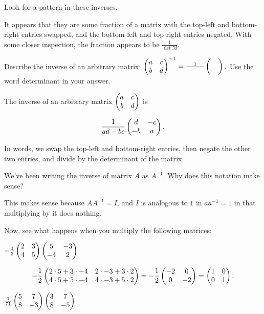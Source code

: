 \documentclass[../gatm_answers.tex]{subfiles}
\begin{document}
\begin{inner_problem}[start=1]
\item Look for a pattern in these inverses.
\end{inner_problem}

It appears that they are some fraction of a matrix with the top-left and bottom-right entries swapped, and the bottom-left and top-right entries negated. With some closer inspection, the fraction appears to be $\frac{1}{\det M}$.

\begin{inner_problem}
\item Describe the inverse of an arbitrary matrix: $\begin{pmatrix} a & c \\ b & d \end{pmatrix}^{-1}=\frac{1}{\phantom{000000}}\begin{pmatrix}  &  \\  &  \end{pmatrix}.$ Use the word determinant in your answer.
\end{inner_problem}

The inverse of an arbitrary matrix $\begin{pmatrix} a & c \\ b & d \end{pmatrix}$ is

$$\frac{1}{ad-bc}\begin{pmatrix} d & -c \\ -b & a \end{pmatrix}.$$

In words, we swap the top-left and bottom-right entries, then negate the other two entries, and divide by the determinant of the matrix.

\begin{inner_problem}
\item We've been writing the inverse of matrix $A$ as $A^{-1}$. Why does this notation make sense?
\end{inner_problem}

This makes sense because $AA^{-1}=I$, and $I$ is analogous to $1$ in $aa^{-1}=1$ in that multiplying by it does nothing.

\begin{outer_problem}
\item Now, see what happens when you multiply the following matrices:
\end{outer_problem}

\begin{inner_problem}[start=1]
\item $-\frac{1}{2}\begin{pmatrix} 2 & 3 \\ 4 & 5 \end{pmatrix}\begin{pmatrix} 5 & -3 \\ -4 & 2 \end{pmatrix}$
\end{inner_problem}

$$-\frac{1}{2}\begin{pmatrix} 2\cdot 5 + 3\cdot -4 & 2\cdot -3 + 3\cdot 2 \\ 4\cdot 5 + 5\cdot -4 & 4\cdot -3 + 5\cdot 2 \end{pmatrix} = -\frac{1}{2}\begin{pmatrix} -2 & 0 \\ 0 & -2 \end{pmatrix} = \begin{pmatrix} 1 & 0 \\ 0 & 1 \end{pmatrix}.$$

\begin{inner_problem}
\item $\frac{1}{71}\begin{pmatrix} 5 & 7 \\ 8 & -3 \end{pmatrix}\begin{pmatrix} 3 & 7 \\ 8 & -5 \end{pmatrix}$
\end{inner_problem}
\end{document}

